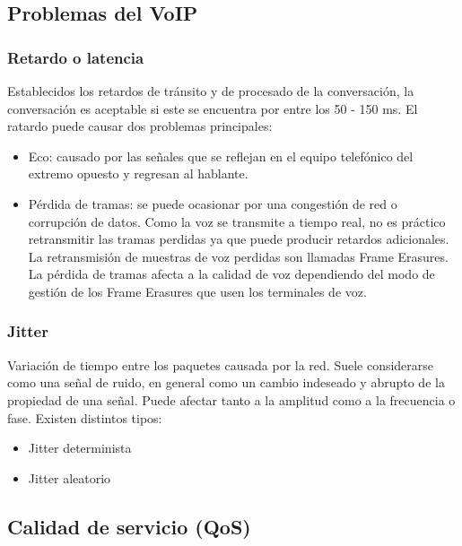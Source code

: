 \documentclass[a4paper, 11pt]{article} %
\begin{document}
	\subsection{Problemas del VoIP}
	\subsubsection{Retardo o latencia}
	Establecidos los retardos de tránsito y de procesado de la conversación, la conversación es aceptable si este se encuentra por entre los 50 - 150 ms. 
	El ratardo puede causar dos problemas principales:
		\begin{itemize}
		\item Eco: causado por las señales que se reflejan en el equipo telefónico del extremo opuesto y regresan al hablante.
		\item Pérdida de tramas: se puede ocasionar por una congestión de red o corrupción de datos. Como la voz se transmite a tiempo real, no es práctico retransmitir las tramas perdidas ya que puede producir retardos adicionales. La retransmisión de muestras de voz perdidas son llamadas Frame Erasures. La pérdida de tramas afecta a la calidad de voz dependiendo del modo de gestión de los Frame Erasures que usen los terminales de voz.
		\end{itemize}
	\subsubsection{Jitter}
	Variación de tiempo entre los paquetes causada por la red. Suele considerarse como una señal de ruido, en general como un cambio indeseado y abrupto de la propiedad de una señal. Puede afectar tanto a la amplitud como a la frecuencia o fase.
	Existen distintos tipos:
		\begin{itemize}
		\item Jitter determinista
		\item Jitter aleatorio
		\end{itemize}
	
	\subsection{Calidad de servicio (QoS)}
\end{document}
